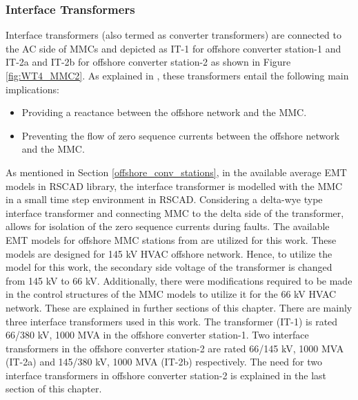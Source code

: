 \subsubsection{Interface Transformers}
Interface transformers (also termed as converter transformers) are connected to the \gls{AC} side of \gls{MMC}s and depicted as IT-1 for offshore converter station-1 and IT-2a and IT-2b for offshore converter station-2 as shown in Figure \ref{fig:WT4_MMC2}. As explained in \cite{cigre2005b4}, these transformers entail the following main implications:
\begin{itemize}
    \item Providing a reactance between the offshore network and the \gls{MMC}.
    \item Preventing the flow of zero sequence currents between the offshore network and the \gls{MMC}.
\end{itemize} 

As mentioned in Section \ref{offshore_conv_stations}, in the available average \gls{EMT} models in RSCAD library, the interface transformer is modelled with the \gls{MMC} in a small time step environment in RSCAD. Considering a delta-wye type interface transformer and connecting \gls{MMC} to the delta side of the transformer, allows for isolation of the zero sequence currents during faults. The available \gls{EMT} models for offshore \gls{MMC} stations from \cite{vrana2013cigre} are utilized for this work. These models are designed for 145 kV \gls{HVAC} offshore network. Hence, to utilize the model for this work, the secondary side voltage of the transformer is changed from 145 kV to 66 kV. Additionally, there were modifications required to be made in the control structures of the \gls{MMC} models to utilize it for the 66 kV \gls{HVAC} network. These are explained in further sections of this chapter. There are mainly three interface transformers used in this work. The transformer (IT-1) is rated 66/380 kV, 1000 MVA in the offshore converter station-1. Two interface transformers in the offshore converter station-2 are rated 66/145 kV, 1000 MVA (IT-2a) and 145/380 kV, 1000 MVA (IT-2b) respectively. The need for two interface transformers in offshore converter station-2 is explained in the last section of this chapter.


